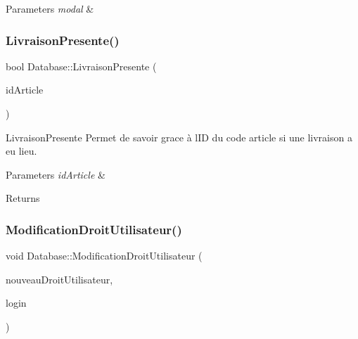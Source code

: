 \begin{DoxyParams}{Parameters}
{\em modal} & \\
\hline
\end{DoxyParams}
\mbox{\label{class_database_a3ff850cad75331fdaa5a98f1e656b58e}} 
\subsubsection{\texorpdfstring{Livraison\+Presente()}{LivraisonPresente()}}
{\footnotesize\ttfamily bool Database\+::\+Livraison\+Presente (\begin{DoxyParamCaption}\item[{int}]{id\+Article }\end{DoxyParamCaption})\hspace{0.3cm}{\ttfamily [private]}}



Livraison\+Presente Permet de savoir grace à l\textquotesingle{}ID du code article si une livraison a eu lieu. 


\begin{DoxyParams}{Parameters}
{\em id\+Article} & \\
\hline
\end{DoxyParams}
\begin{DoxyReturn}{Returns}

\end{DoxyReturn}
\mbox{\label{class_database_a3ca1877a1fba73d77764ea5676dfa07d}} 
\subsubsection{\texorpdfstring{Modification\+Droit\+Utilisateur()}{ModificationDroitUtilisateur()}}
{\footnotesize\ttfamily void Database\+::\+Modification\+Droit\+Utilisateur (\begin{DoxyParamCaption}\item[{int}]{nouveau\+Droit\+Utilisateur,  }\item[{Q\+String}]{login }\end{DoxyParamCaption})}



